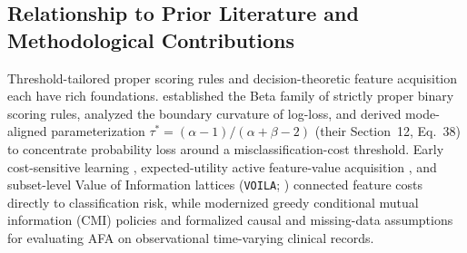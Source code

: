 \documentclass[11pt]{article}
\begin{document}
\subsection{Relationship to Prior Literature and Methodological Contributions}

Threshold-tailored proper scoring rules and decision-theoretic feature acquisition each have rich foundations. \citet{buja2005loss} established the Beta family of strictly proper binary scoring rules, analyzed the boundary curvature of log-loss, and derived mode-aligned parameterization $\tau^* = (\alpha - 1)/(\alpha + \beta - 2)$ (their Section~12, Eq.~38) to concentrate probability loss around a misclassification-cost threshold. Early cost-sensitive learning \citep{turney1995cost}, expected-utility active feature-value acquisition \citep{saartsechansky2009active}, and subset-level Value of Information lattices (\texttt{VOILA}; \citealp{bilgic2011value}) connected feature costs directly to classification risk, while \citet{covert2023learning} modernized greedy conditional mutual information (CMI) policies and \citet{vonkleist2025evaluation} formalized causal and missing-data assumptions for evaluating AFA on observational time-varying clinical records.
\end{document}
